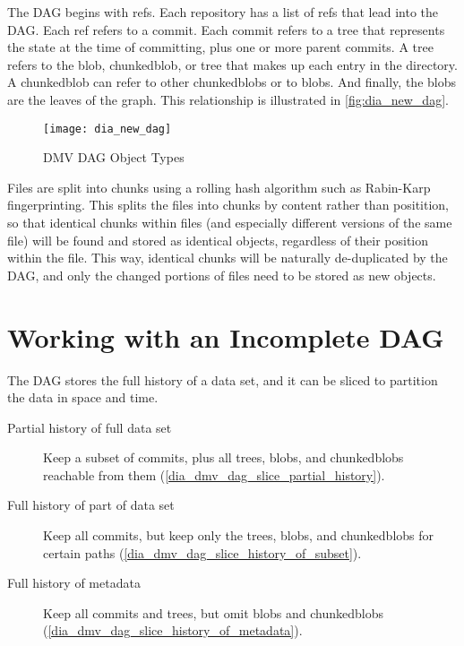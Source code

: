 The \gls{DAG} begins with refs. Each repository has a list of refs that lead
into the \gls{DAG}. Each ref refers to a \gls{commit}. Each \gls{commit} refers
to a \gls{tree} that represents the state at the time of committing, plus one or
more parent \glspl{commit}. A \gls{tree} refers to the \gls{blob},
\gls{chunkedblob}, or \gls{tree} that makes up each entry in the directory. A
\gls{chunkedblob} can refer to other \glspl{chunkedblob} or to \glspl{blob}. And
finally, the \glspl{blob} are the leaves of the graph. This relationship is
illustrated in \autoref{fig:dia_new_dag}.

\begin{figure}[]
    \centering
        \texttt{[image: dia\_new\_dag]}
    \caption{DMV DAG Object Types}
    \label{fig:dia_new_dag}
\end{figure}


Files are split into chunks using a rolling hash algorithm such as Rabin-Karp
fingerprinting\cite{rabin_karp_fingerprinting}. This splits the files into
chunks by content rather than positition, so that identical chunks within files
(and especially different versions of the same file) will be found and stored as
identical objects, regardless of their position within the file. This way,
identical chunks will be naturally de-duplicated by the \gls{DAG}, and only the
changed portions of files need to be stored as new objects.

%


\section{Working with an Incomplete DAG}

The \gls{DAG} stores the full history of a data set, and it can be sliced to
partition the data in space and time.

\begin{description}

    \item[Partial history of full data set] Keep a subset of \glspl{commit},
        plus all \glspl{tree}, \glspl{blob}, and \glspl{chunkedblob} reachable
        from them (\autoref{dia_dmv_dag_slice_partial_history}).

    \item[Full history of part of data set] Keep all \glspl{commit}, but keep
        only the \glspl{tree}, \glspl{blob}, and \glspl{chunkedblob} for certain
        paths (\autoref{dia_dmv_dag_slice_history_of_subset}).

    \item[Full history of metadata] Keep all \glspl{commit} and \glspl{tree},
        but omit \glspl{blob} and \glspl{chunkedblob}
        (\autoref{dia_dmv_dag_slice_history_of_metadata}).

\end{description}


